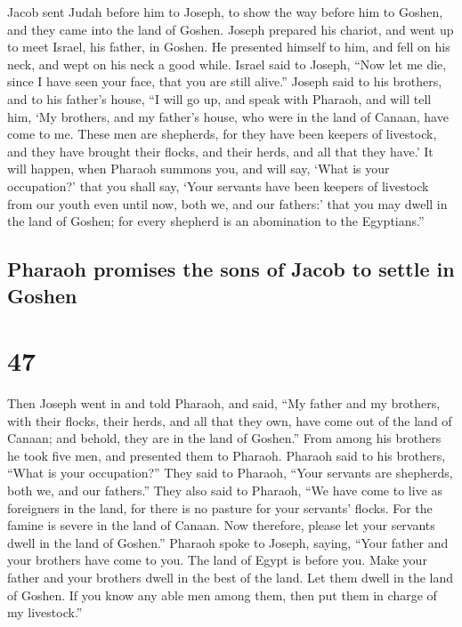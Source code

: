 Jacob sent Judah before him to Joseph, to show the way
before him to Goshen, and they came into the land of Goshen.
 Joseph prepared his chariot, and went up to meet Israel,
his father, in Goshen. He presented himself to him, and fell on his
neck, and wept on his neck a good while.  Israel said to
Joseph, ``Now let me die, since I have seen your face, that you are
still alive.''  Joseph said to his brothers, and to his
father's house, ``I will go up, and speak with Pharaoh, and will tell
him, `My brothers, and my father's house, who were in the land of
Canaan, have come to me.  These men are shepherds, for
they have been keepers of livestock, and they have brought their flocks,
and their herds, and all that they have.'  It will
happen, when Pharaoh summons you, and will say, `What is your
occupation?'  that you shall say, `Your servants have
been keepers of livestock from our youth even until now, both we, and
our fathers:' that you may dwell in the land of Goshen; for every
shepherd is an abomination to the Egyptians.''

\hypertarget{pharaoh-promises-the-sons-of-jacob-to-settle-in-goshen}{%
\subsection{Pharaoh promises the sons of Jacob to settle in
Goshen}\label{pharaoh-promises-the-sons-of-jacob-to-settle-in-goshen}}

\hypertarget{section-46}{%
\section{47}\label{section-46}}

 Then Joseph went in and told Pharaoh, and said, ``My
father and my brothers, with their flocks, their herds, and all that
they own, have come out of the land of Canaan; and behold, they are in
the land of Goshen.''  From among his brothers he took
five men, and presented them to Pharaoh.  Pharaoh said to
his brothers, ``What is your occupation?'' They said to Pharaoh, ``Your
servants are shepherds, both we, and our fathers.''  They
also said to Pharaoh, ``We have come to live as foreigners in the land,
for there is no pasture for your servants' flocks. For the famine is
severe in the land of Canaan. Now therefore, please let your servants
dwell in the land of Goshen.''  Pharaoh spoke to Joseph,
saying, ``Your father and your brothers have come to you. 
The land of Egypt is before you. Make your father and your brothers
dwell in the best of the land. Let them dwell in the land of Goshen. If
you know any able men among them, then put them in charge of my
livestock.''

